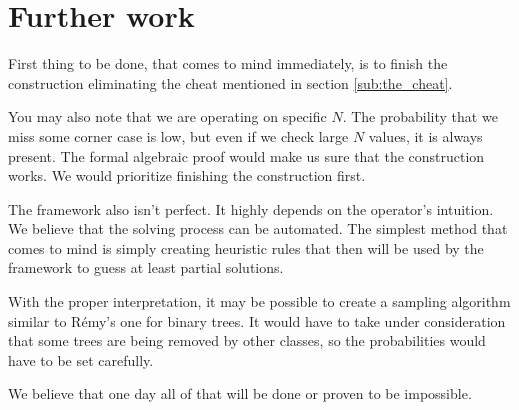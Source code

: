 \documentclass[final]{article}
\theoremstyle{definition}
\theoremstyle{remark}
\begin{document}
\section{Further work}%
\label{sec:further_work}

First thing to be done, that comes to mind immediately, is to finish the construction eliminating the cheat mentioned in section \ref{sub:the_cheat}.

You may also note that we are operating on specific \(N\). The probability that we miss some corner case is low, but even if we check large \(N\) values, it is always present. The formal algebraic proof would make us sure that the construction works. We would prioritize finishing the construction first.

The framework also isn't perfect. It highly depends on the operator's intuition. We believe that the solving process can be automated. The simplest method that comes to mind is simply creating heuristic rules that then will be used by the framework to guess at least partial solutions.

With the proper interpretation, it may be possible to create a sampling algorithm similar to Rémy's one for binary trees\cite{remy,note}. It would have to take under consideration that some trees are being removed by other classes, so the probabilities would have to be set carefully.

We believe that one day all of that will be done or proven to be impossible.

\clearpage
\end{document}
